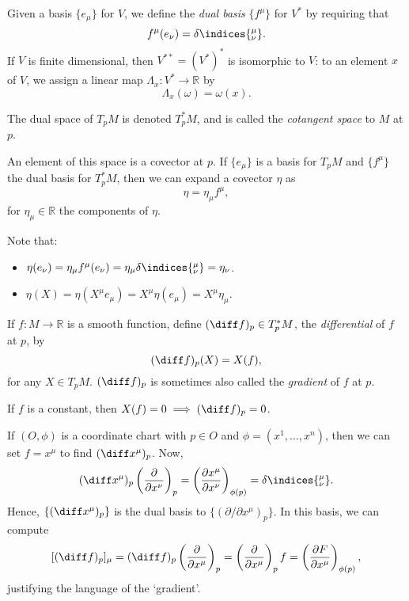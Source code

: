 \documentclass[12pt]{article}
\begin{document}
Given a basis $\{e_\mu\}$ for $V$, we define the \emph{dual basis} $\{f^\mu\}$ for $V^\ast$ by requiring that
\[
f^\mu(e_\nu) = \delta\indices{^{\mu}_{\nu}}.
\]
If $V$ is finite dimensional, then $V^{\ast\ast} = (V^\ast)^\ast$ is isomorphic to $V$: to an element $x$ of $V$, we assign a linear map $\Lambda_x : V^\ast \to \mathbb{R}$ by
\[
\Lambda_x(\omega) = \omega(x).
\]
\begin{definition}
	The dual space of $T_pM$ is denoted $T^\ast_p M$, and is called the \emph{cotangent space} to $M$ at $p$.

	An element of this space is a covector at $p$. If $\{e_\mu\}$ is a basis for $T_p M$ and $\{f^\mu\}$ the dual basis for $T^\ast_p M$, then we can expand a covector $\eta$ as
	\[
	\eta = \eta_\mu f^\mu,
	\]
	for $\eta_\mu \in \mathbb{R}$ the components of $\eta$.
\end{definition}


Note that:
\begin{itemize}
	\item $\eta(e_\nu) = \eta_\mu f^\mu (e_\nu) = \eta_\mu \delta\indices{^{\mu}_{\nu}} = \eta_\nu$.
	\item $\eta(X) = \eta(X^\mu e_\mu) = X^\mu \eta(e_\mu) = X^\mu \eta_\mu$.
\end{itemize}

\begin{definition}
	If $f : M \to \mathbb{R}$ is a smooth function, define $(\diff f)_p \in T^\ast_p M$, the \emph{differential} of $f$ at $p$, by
	\[
		(\diff f)_p (X) = X(f),
	\]
	for any $X \in T_p M$. $(\diff f)_p$ is sometimes also called the \emph{gradient} of $f$ at $p$.
\end{definition}

If $f$ is a constant, then $X(f) = 0 \implies (\diff f)_p = 0$.

If $(O, \phi)$ is a coordinate chart with $p \in O$ and $\phi = (x^1, \ldots, x^n)$, then we can set $f = x^\mu$ to find $(\diff x^\mu)_p$. Now,
\[
	(\diff x^\mu)_p \left( \frac{\partial}{\partial x^\nu} \right)_p = \left( \frac{\partial x^\mu}{\partial x^\nu} \right)_{\phi(p)} = \delta\indices{^{\mu}_{\nu}}.
\]
Hence, $\{(\diff x^\mu)_p\}$ is the dual basis to $\{(\partial/\partial x^\mu)_p\}$. In this basis, we can compute
\[
	[(\diff f)_p]_\mu = (\diff f)_p \left( \frac{\partial}{\partial x^\mu} \right)_p = \left( \frac{\partial}{\partial x^\mu} \right)_p f = \left( \frac{\partial F}{\partial x^\mu} \right)_{\phi(p)},
\]
justifying the language of the `gradient'.
\end{document}
